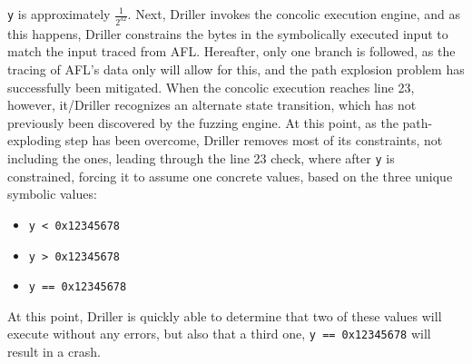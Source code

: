 \documentclass[a4paper]{article}
\newcommand{\ttt}[1]{\texttt{#1}}
\begin{document}
\ttt{y} is approximately $\frac{1}{2^{32}}$. Next, Driller invokes the concolic execution engine, and as this happens, Driller constrains the bytes in the symbolically executed input to match the input traced from AFL. Hereafter, only one branch is followed, as the tracing of AFL's data only will allow for this, and the path explosion problem has successfully been mitigated. When the concolic execution reaches line 23, however, it/Driller recognizes an alternate state transition, which has not previously been discovered by the fuzzing engine. At this point, as the path-exploding step has been overcome, Driller removes most of its constraints, not including the ones, leading through the line 23 check, where after \ttt{y} is constrained, forcing it to assume one concrete values, based on the three unique symbolic values:
\begin{itemize}
	\item \ttt{y < 0x12345678}
	\item \ttt{y > 0x12345678}
	\item \ttt{y == 0x12345678}
\end{itemize}
At this point, Driller is quickly able to determine that two of these values will execute without any errors, but also that a third one, \ttt{y == 0x12345678} will result in a crash. 
\end{document}
